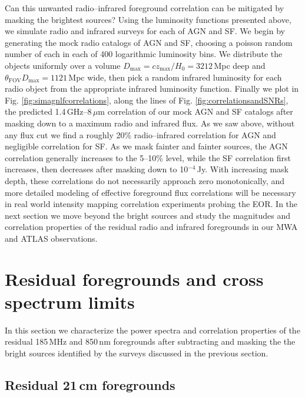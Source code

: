 \documentclass[numberedappendix]{emulateapj}
\newcommand{\maxtext}{\text{max}}
\begin{document}
Can this unwanted radio--infrared foreground correlation can be mitigated by masking the brightest sources? Using the luminosity functions presented above, we simulate radio and infrared surveys for each of AGN and SF. We begin by generating the mock radio catalogs of AGN and SF, choosing a poisson random number of each in each of 400 logarithmic luminosity bins. We distribute the objects uniformly over a volume $D_\maxtext=cz_\maxtext/H_0=3212$\,Mpc deep and $\theta_{\text{FOV}}D_\maxtext=1121$\,Mpc wide, then pick a random infrared luminosity for each radio object from the appropriate infrared luminosity function. Finally we plot in Fig. \ref{fig:simagnlfcorrelations}, along the lines of Fig. \ref{fig:correlationsandSNRs}, the predicted 1.4\,GHz--8\,$\mu$m correlation of our mock AGN and SF catalogs after masking down to a maximum radio and infrared flux. As we saw above, without any flux cut we find a roughly 20\% radio--infrared correlation for AGN and negligible correlation for SF. As we mask fainter and fainter sources, the AGN correlation generally increases to the 5--10\% level, while the SF correlation first increases, then decreases after masking down to 10$^{-4}$\,Jy. With increasing mask depth, these correlations do not necessarily approach zero monotonically, and more detailed modeling of effective foreground flux correlations will be necessary in real world intensity mapping correlation experiments probing the EOR. In the next section we move beyond the bright sources and study the magnitudes and correlation properties of the residual radio and infrared foregrounds in our MWA and ATLAS observations.


\section{Residual foregrounds and cross spectrum limits}

In this section we characterize the power spectra and correlation properties of the residual 185\,MHz and 850\,nm foregrounds after subtracting and masking  the the bright sources identified by the surveys discussed in the previous section.

\subsection{Residual 21\,cm foregrounds}
\label{sec:res21fgs}
\end{document}
